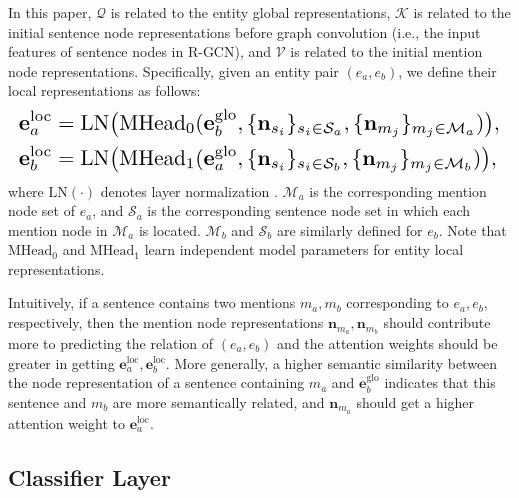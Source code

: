 \documentclass[11pt,a4paper]{article}
\begin{document}
In this paper, $\mathcal{Q}$ is related to the entity global representations, $\mathcal{K}$ is related to the initial sentence node representations before graph convolution (i.e., the input features of sentence nodes in R-GCN), and $\mathcal{V}$ is related to the initial mention node representations. 
Specifically, given an entity pair $(e_a,e_b)$, we define their local representations as follows:
\begin{align}
\resizebox{\columnwidth}{!}{$\begin{aligned}
\mathbf{e}_a^\textrm{loc} &= \mathrm{LN}\big( \mathrm{MHead}_0(\mathbf{e}_b^\textrm{glo}, \{\mathbf{n}_{s_i}\}_{s_i\in \mathcal{S}_a}, \{\mathbf{n}_{m_j}\}_{m_j\in \mathcal{M}_a}) \big), \\
\mathbf{e}_b^\textrm{loc} &= \mathrm{LN}\big( \mathrm{MHead}_1(\mathbf{e}_a^\textrm{glo}, \{\mathbf{n}_{s_i}\}_{s_i\in \mathcal{S}_b}, \{\mathbf{n}_{m_j}\}_{m_j\in \mathcal{M}_b}) \big), \\
\end{aligned}$}
\end{align} 
where $\mathrm{LN}(\cdot)$ denotes layer normalization \cite{ba2016layer}. $\mathcal{M}_a$ is the corresponding mention node set of $e_a$, and $\mathcal{S}_a$ is the corresponding sentence node set in which each mention node in $\mathcal{M}_a$ is located. $\mathcal{M}_b$ and $\mathcal{S}_b$ are similarly defined for $e_b$. Note that $\mathrm{MHead}_0$ and $\mathrm{MHead}_1$ learn independent model parameters for entity local representations.

Intuitively, if a sentence contains two mentions $m_a,m_b$ corresponding to $e_a,e_b$, respectively, then the mention node representations $\mathbf{n}_{m_a},\mathbf{n}_{m_b}$ should contribute more to predicting the relation of $(e_a,e_b)$ and the attention weights should be greater in getting $\mathbf{e}_a^\textrm{loc},\mathbf{e}_b^\textrm{loc}$. More generally, a higher semantic similarity between the node representation of a sentence containing $m_a$ and $\mathbf{e}^\textrm{glo}_b$ indicates that this sentence and $m_b$ are more semantically related, and $\textbf{n}_{m_a}$ should get a higher attention weight to $\mathbf{e}^\textrm{loc}_a$.

\subsection{Classifier Layer}
\end{document}
